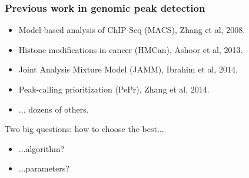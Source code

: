 \documentclass{beamer}
\begin{document}
\begin{frame}
  \frametitle{Previous work in genomic peak detection}
  \begin{itemize}
  \item Model-based analysis of ChIP-Seq (MACS), Zhang et al, 2008.
  \item Histone modifications in cancer (HMCan), Ashoor et al, 2013.
  \item Joint Analysis Mixture Model (JAMM), Ibrahim et al, 2014.
  \item Peak-calling prioritization (PePr), Zhang et al, 2014.
  \item ... dozens of others.
  \end{itemize}
  Two big questions: how to choose the best...
  \begin{itemize}
  \item ...algorithm?
  \item ...parameters?
  \end{itemize}
\end{frame}
\end{document}
